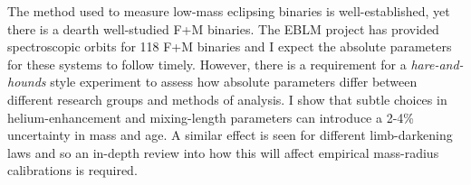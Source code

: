 The method used to measure low-mass eclipsing binaries is well-established, yet there is a dearth well-studied F+M binaries. The EBLM project has provided spectroscopic orbits for 118 F+M binaries and I expect the absolute parameters for these systems to follow timely. However, there is a requirement for a \textit{hare-and-hounds} style experiment to assess how absolute parameters differ between different research groups and methods of analysis. I show that subtle choices in helium-enhancement and mixing-length parameters can introduce a 2-4\% uncertainty in mass and age. A similar effect is seen for different limb-darkening laws and so an in-depth review into how this will affect empirical mass-radius calibrations is required. 
